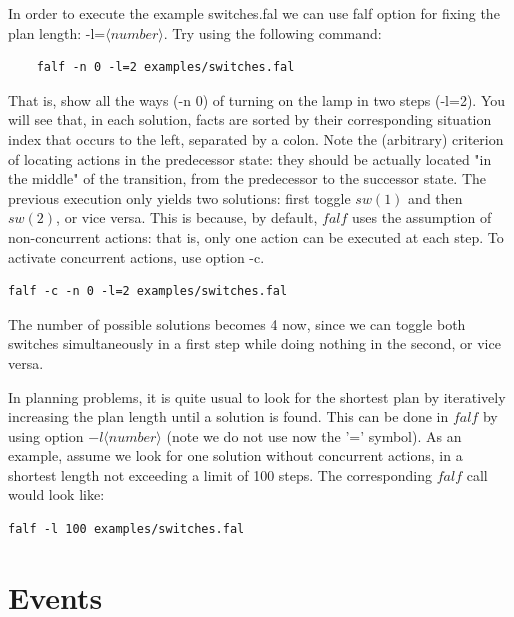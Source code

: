 \documentclass[a4paper,12pt]{report}
\begin{document}
\vspace{0.5cm}
\begin{mdframed}[backgroundcolor=blue!20]
In order to execute the example switches.fal we can use falf option for fixing the plan length: -l=$ \langle number \rangle$. Try using the following command:

	\begin{verbatim}
	falf -n 0 -l=2 examples/switches.fal
	\end{verbatim}

That is, show all the ways (-n 0) of turning on the lamp in two steps (-l=2). You will see that, in each solution, facts are sorted by their corresponding situation index that occurs to the left, separated by a colon. Note the (arbitrary) criterion of locating actions in the predecessor state: they should be actually located "in the middle" of the transition, from the predecessor to the successor state. The previous execution only yields two solutions: first toggle $sw(1)$ and then $sw(2)$, or vice versa. This is because, by default, $falf$ uses the assumption of {\color{red}non-concurrent actions}: that is, only one action can be executed at each step. To activate concurrent actions, use option -c.

\begin{verbatim}
falf -c -n 0 -l=2 examples/switches.fal
\end{verbatim}

The number of possible solutions becomes 4 now, since we can toggle both switches simultaneously in a first step while doing nothing in the second, or vice versa. 

In planning problems, it is quite usual to look for the shortest plan by iteratively increasing the plan length until a solution is found. This can be done in $falf$ by using option $-l \langle number \rangle $ (note we do not use now the '=' symbol). As an example, assume we look for one solution without concurrent actions, in a shortest length not exceeding a limit of 100 steps. The corresponding $falf$ call would look like:

\begin{verbatim}
falf -l 100 examples/switches.fal
\end{verbatim}

\end{mdframed}
\vspace{0.5cm}

\section{Events}
\end{document}
